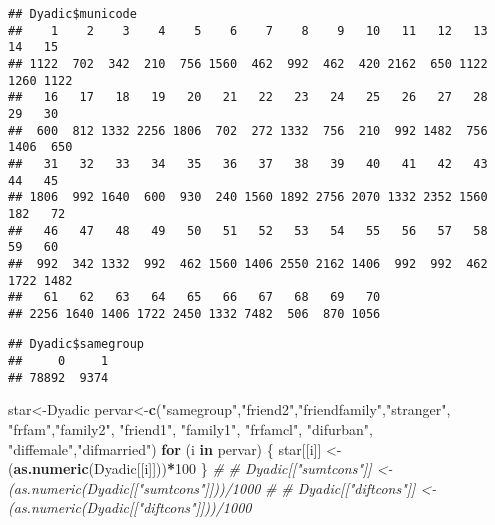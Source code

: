 \documentclass[]{article}
\newenvironment{Shaded}{\begin{snugshade}}{\end{snugshade}}
\newcommand{\KeywordTok}[1]{\textcolor[rgb]{0.13,0.29,0.53}{\textbf{#1}}}
\newcommand{\DataTypeTok}[1]{\textcolor[rgb]{0.13,0.29,0.53}{#1}}
\newcommand{\DecValTok}[1]{\textcolor[rgb]{0.00,0.00,0.81}{#1}}
\newcommand{\StringTok}[1]{\textcolor[rgb]{0.31,0.60,0.02}{#1}}
\newcommand{\CommentTok}[1]{\textcolor[rgb]{0.56,0.35,0.01}{\textit{#1}}}
\newcommand{\ControlFlowTok}[1]{\textcolor[rgb]{0.13,0.29,0.53}{\textbf{#1}}}
\newcommand{\OperatorTok}[1]{\textcolor[rgb]{0.81,0.36,0.00}{\textbf{#1}}}
\newcommand{\NormalTok}[1]{#1}
\begin{document}
\begin{verbatim}
## Dyadic$municode
##    1    2    3    4    5    6    7    8    9   10   11   12   13   14   15 
## 1122  702  342  210  756 1560  462  992  462  420 2162  650 1122 1260 1122 
##   16   17   18   19   20   21   22   23   24   25   26   27   28   29   30 
##  600  812 1332 2256 1806  702  272 1332  756  210  992 1482  756 1406  650 
##   31   32   33   34   35   36   37   38   39   40   41   42   43   44   45 
## 1806  992 1640  600  930  240 1560 1892 2756 2070 1332 2352 1560  182   72 
##   46   47   48   49   50   51   52   53   54   55   56   57   58   59   60 
##  992  342 1332  992  462 1560 1406 2550 2162 1406  992  992  462 1722 1482 
##   61   62   63   64   65   66   67   68   69   70 
## 2256 1640 1406 1722 2450 1332 7482  506  870 1056
\end{verbatim}

\begin{Shaded}
\end{Shaded}

\begin{verbatim}
## Dyadic$samegroup
##     0     1 
## 78892  9374
\end{verbatim}

\begin{Shaded}
\end{Shaded}

\begin{Shaded}
\begin{Highlighting}[]
\NormalTok{star<-Dyadic}
\NormalTok{pervar<-}\KeywordTok{c}\NormalTok{(}\StringTok{"samegroup"}\NormalTok{,}\StringTok{"friend2"}\NormalTok{,}\StringTok{"friendfamily"}\NormalTok{,}\StringTok{"stranger"}\NormalTok{, }\StringTok{"frfam"}\NormalTok{,}\StringTok{"family2"}\NormalTok{, }\StringTok{"friend1"}\NormalTok{, }\StringTok{"family1"}\NormalTok{, }\StringTok{"frfamcl"}\NormalTok{, }\StringTok{"difurban"}\NormalTok{, }\StringTok{"diffemale"}\NormalTok{,}\StringTok{"difmarried"}\NormalTok{)}
\ControlFlowTok{for}\NormalTok{ (i }\ControlFlowTok{in}\NormalTok{ pervar) \{}
\NormalTok{star[[i]] <-}\StringTok{ }\NormalTok{(}\KeywordTok{as.numeric}\NormalTok{(Dyadic[[i]]))}\OperatorTok{*}\DecValTok{100}
\NormalTok{\}}
\CommentTok{# }
\CommentTok{# Dyadic[["sumtcons"]] <- (as.numeric(Dyadic[["sumtcons"]]))/1000}
\CommentTok{# }
\CommentTok{# Dyadic[["diftcons"]] <- (as.numeric(Dyadic[["diftcons"]]))/1000}
\end{Highlighting}
\end{Shaded}
\end{document}
